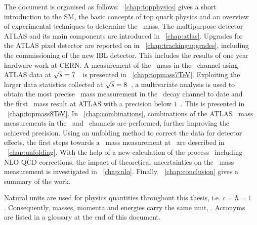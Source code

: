 The document is organised as follows:
%
\chap~\ref{chap:topphysics} gives a short introduction to the \gls{SM}, the basic concepts of top quark physics and an overview of experimental techniques to determine the \tquark\ mass.
%
The multipurpose detector \gls{ATLAS} and its main components are introduced in \chap~\ref{chap:atlas}.
%
Upgrades for the \gls{ATLAS} pixel detector are reported on in \chap~\ref{chap:trackingupgrades}, including the commissioning of the new \gls{IBL} detector. This includes the results of one year hardware work at \gls{CERN}.
%
A measurement of the \tquark\ mass in the \dil\ channel using \gls{ATLAS} data at ${\sqrt{s}} = 7$~\TeV\ is presented in \chap~\ref{chap:topmass7TeV}.
%
Exploiting the larger data statistics collected at ${\sqrt{s}} = 8$~\TeV, a multivariate analysis is used to obtain the most precise \tquark\ mass measurement in the \ttbarll\ decay channel to date and the first \tquark\ mass result at \gls{ATLAS} with a precision below $1$~\GeV. This is presented in \chap~\ref{chap:topmass8TeV}.
%
In \chap~\ref{chap:combinations}, combinations of the \gls{ATLAS} \tquark\ mass measurements in the \dil\ and \ljets\ channels are performed, further improving the achieved precision.
%
Using an unfolding method to correct the data for detector effects, the first steps towards a \tquark\ mass measurement at \stablevel\ are described in \chap~\ref{chap:unfolding}.
%
With the help of a new calculation of the process \ppWWbb\ including \gls{NLO} \gls{QCD} corrections, the impact of theoretical uncertainties on the \tquark\ mass measurement is investigated in \chap~\ref{chap:nlo}.
%
Finally, \chap~\ref{chap:conclusion} gives a summary of the work.


Natural units are used for physics quantities throughout this thesis, i.e. $c=\hbar=1$. Consequently, masses, momenta and energies carry the same unit, \GeV. Acronyms are listed in a glossary at the end of this document.
